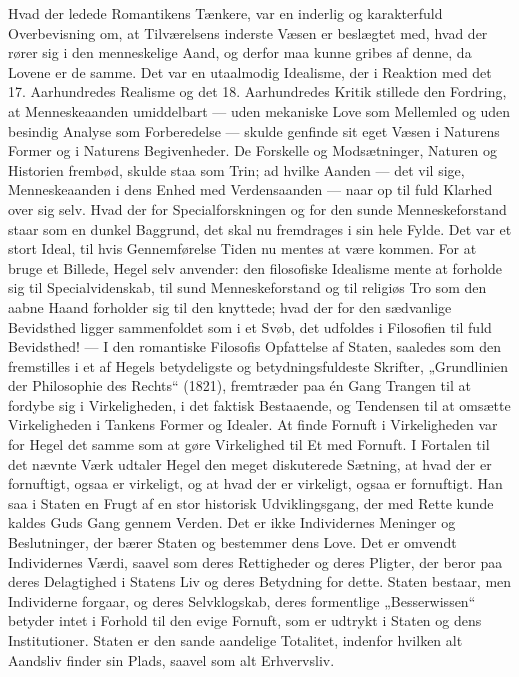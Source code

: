 \documentclass[12pt,a4paper,openany]{book}
\newcommand{\opage}[1]{\marginnote{\footnotesize\textit{[#1]}}}
\begin{document}
Hvad der ledede Romantikens Tænkere, var en inderlig og karakterfuld
Overbevisning om, at Tilværelsens inderste Væsen er beslægtet
med, hvad der rører sig i den menneskelige Aand, og derfor maa
kunne gribes af denne, da Lovene er de samme. Det var en utaalmodig
Idealisme, der i Reaktion med det 17. Aarhundredes Realisme
og det 18. Aarhundredes Kritik stillede den Fordring, at Menneskeaanden
umiddelbart --- uden mekaniske Love som Mellemled og
uden besindig Analyse som Forberedelse --- skulde genfinde sit eget
Væsen i Naturens Former og i Naturens Begivenheder. De Forskelle
og Modsætninger, Naturen og Historien frembød, skulde staa som
Trin; ad hvilke Aanden --- det vil sige, Menneskeaanden i dens Enhed
med Verdensaanden --- naar op til fuld Klarhed over sig selv.
Hvad der for Specialforskningen og for den sunde Menneskeforstand
staar som en dunkel Baggrund, det skal nu fremdrages i sin hele
Fylde. Det var et stort Ideal, til hvis Gennemførelse Tiden nu mentes
at være kommen. For at bruge et Billede, Hegel selv anvender:
den filosofiske Idealisme mente at forholde sig til Specialvidenskab,
til sund Menneskeforstand og til religiøs Tro som den aabne Haand
forholder sig til den knyttede; hvad der for den sædvanlige Bevidsthed
ligger sammenfoldet som i et Svøb, det udfoldes i Filosofien til
fuld Bevidsthed! ---
I den romantiske Filosofis Opfattelse af Staten, saaledes som den
fremstilles i et af Hegels betydeligste og betydningsfuldeste Skrifter,
\opage{13}„Grundlinien der Philosophie des Rechts“ (1821), fremtræder paa
én Gang Trangen til at fordybe sig i Virkeligheden, i det faktisk Bestaaende,
og Tendensen til at omsætte Virkeligheden i Tankens Former
og Idealer. At finde Fornuft i Virkeligheden var for Hegel det
samme som at gøre Virkelighed til Et med Fornuft. I Fortalen til det
nævnte Værk udtaler Hegel den meget diskuterede Sætning, at hvad
der er fornuftigt, ogsaa er virkeligt, og at hvad der er virkeligt, ogsaa
er fornuftigt. Han saa i Staten en Frugt af en stor historisk Udviklingsgang,
der med Rette kunde kaldes Guds Gang gennem Verden.
Det er ikke Individernes Meninger og Beslutninger, der bærer
Staten og bestemmer dens Love. Det er omvendt Individernes Værdi,
saavel som deres Rettigheder og deres Pligter, der beror paa deres
Delagtighed i Statens Liv og deres Betydning for dette. Staten bestaar,
men Individerne forgaar, og deres Selvklogskab, deres formentlige
„Besserwissen“ betyder intet i Forhold til den evige Fornuft,
som er udtrykt i Staten og dens Institutioner. Staten er den
sande aandelige Totalitet, indenfor hvilken alt Aandsliv finder sin
Plads, saavel som alt Erhvervsliv.
\end{document}
